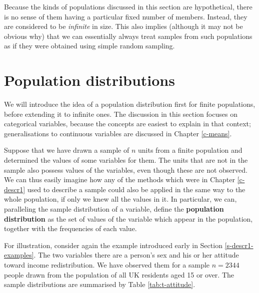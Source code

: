 \documentclass[11pt,a4paper,openany]{book}
\begin{document}
Because the kinds of populations discussed in this section are
hypothetical, there is no sense of them having a particular fixed number
of members. Instead, they are considered to be \emph{infinite} in size.
This also implies (although it may not be obvious why) that we can
essentially always treat samples from such populations as if they were
obtained using simple random sampling.

\section{Population distributions}\label{s-samples-popdistrs}

We will introduce the idea of a population distribution first for finite
populations, before extending it to infinite ones. The discussion in
this section focuses on categorical variables, because the concepts are
easiest to explain in that context; generalisations to continuous
variables are discussed in Chapter \ref{c-means}.

Suppose that we have drawn a sample of \(n\) units from a finite
population and determined the values of some variables for them. The
units that are not in the sample also possess values of the variables,
even though these are not observed. We can thus easily imagine how any
of the methods which were in Chapter \ref{c-descr1} used to describe a
sample could also be applied in the same way to the whole population, if
only we knew all the values in it. In particular, we can, paralleling
the sample distribution of a variable, define the \textbf{population
distribution} as the set of values of the variable which appear in the
population, together with the frequencies of each value.

For illustration, consider again the example introduced early in Section
\ref{s-descr1-examples}. The two variables there are a person's sex and
his or her attitude toward income redistribution. We have observed them
for a sample \(n=2344\) people drawn from the population of all UK
residents aged 15 or over. The sample distributions are summarised by
Table \ref{tab:t-attitude}.
\end{document}
